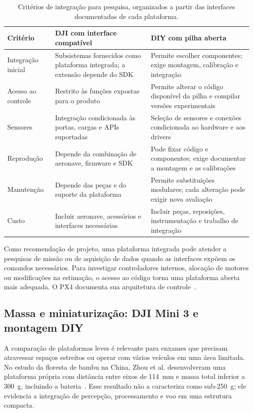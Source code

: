 \documentclass[11pt,a4paper,oneside]{book}
\numberwithin{equation}{chapter}
\begin{document}
\begin{table}[htbp]
\centering\small
\caption{Critérios de integração para pesquisa, organizados a partir das interfaces documentadas de cada plataforma.}
\label{tab:comparacao}
\begin{tabularx}{\textwidth}{@{}>{\raggedright\arraybackslash}p{2.8cm}YY@{}}
\toprule
Critério & DJI com interface compatível & DIY com pilha aberta \\
\midrule
Integração inicial & Subsistemas fornecidos como plataforma integrada; a extensão depende do SDK & Permite escolher componentes; exige montagem, calibração e integração \\
Acesso ao controle & Restrito às funções expostas para o produto & Permite alterar o código disponível da pilha e compilar versões experimentais \\
Sensores & Integração condicionada às portas, cargas e APIs suportadas & Seleção de sensores e conexões condicionada ao hardware e aos drivers \\
Reprodução & Depende da combinação de aeronave, firmware e SDK & Pode fixar código e componentes; exige documentar a montagem e as calibrações \\
Manutenção & Depende das peças e do suporte da plataforma & Permite substituições modulares; cada alteração pode exigir nova avaliação \\
Custo & Incluir aeronave, acessórios e interfaces necessárias & Incluir peças, reposições, instrumentação e trabalho de integração \\
\bottomrule
\end{tabularx}
\end{table}

Como recomendação de projeto, uma plataforma integrada pode atender a pesquisas de missão ou de aquisição de dados quando as interfaces expõem os comandos necessários. Para investigar controladores internos, alocação de motores ou modificações na estimação, o acesso ao código torna uma plataforma aberta mais adequada. O PX4 documenta sua arquitetura de controle~\cite{controle}.

\FloatBarrier
\subsection{Massa e miniaturização: DJI Mini 3 e montagem DIY}\label{sec:sub250}
A comparação de plataformas leves é relevante para enxames que precisam atravessar espaços estreitos ou operar com vários veículos em uma área limitada. No estudo da floresta de bambu na China, Zhou et al. desenvolveram uma plataforma própria com distância entre eixos de 114~mm e massa total inferior a 300~g, incluindo a bateria~\cite{wildpaper}. Esse resultado não a caracteriza como sub-250~g; ele evidencia a integração de percepção, processamento e voo em uma estrutura compacta.
\end{document}
